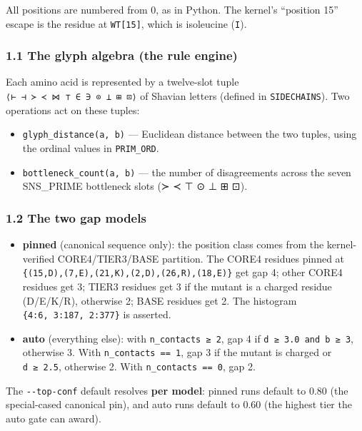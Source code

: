 \documentclass[12pt,a4paper]{article}
\providecommand{\tightlist}{%
  \setlength{\itemsep}{0pt}\setlength{\parskip}{0pt}%
}
\begin{document}
All positions are numbered from 0, as in Python. The kernel's ``position
15'' escape is the residue at \texttt{WT{[}15{]}}, which is isoleucine
(\texttt{\textquotesingle{}I\textquotesingle{}}).

\hypertarget{the-glyph-algebra-the-rule-engine}{%
\subsubsection{1.1 The glyph algebra (the rule
engine)}\label{the-glyph-algebra-the-rule-engine}}

Each amino acid is represented by a twelve-slot tuple
\texttt{⟨⊢\ ⊣\ ≻\ ≺\ ⋈\ ⊤\ ∈\ ∋\ ⊙\ ⊥\ ⊞\ ⊡⟩} of Shavian letters
(defined in \texttt{SIDECHAINS}). Two operations act on these tuples:

\begin{itemize}
\tightlist
\item
  \texttt{glyph\_distance(a,\ b)} --- Euclidean distance between the two
  tuples, using the ordinal values in \texttt{PRIM\_ORD}.
\item
  \texttt{bottleneck\_count(a,\ b)} --- the number of disagreements
  across the seven SNS\_PRIME bottleneck slots (≻ ≺ ⊤ ⊙ ⊥ ⊞ ⊡).
\end{itemize}

\hypertarget{the-two-gap-models}{%
\subsubsection{1.2 The two gap models}\label{the-two-gap-models}}

\begin{itemize}
\tightlist
\item
  \textbf{pinned} (canonical sequence only): the position class comes
  from the kernel-verified CORE4/TIER3/BASE partition. The CORE4
  residues pinned at
  \texttt{\{(15,D),(7,E),(21,K),(2,D),(26,R),(18,E)\}} get gap 4; other
  CORE4 residues get 3; TIER3 residues get 3 if the mutant is a charged
  residue (D/E/K/R), otherwise 2; BASE residues get 2. The histogram
  \texttt{\{4:6,\ 3:187,\ 2:377\}} is asserted.
\item
  \textbf{auto} (everything else): with \texttt{n\_contacts\ ≥\ 2}, gap
  4 if \texttt{d\ ≥\ 3.0\ and\ b\ ≥\ 3}, otherwise 3. With
  \texttt{n\_contacts\ ==\ 1}, gap 3 if the mutant is charged or
  \texttt{d\ ≥\ 2.5}, otherwise 2. With \texttt{n\_contacts\ ==\ 0}, gap
  2.
\end{itemize}

The \texttt{-\/-top-conf} default resolves \textbf{per model}: pinned
runs default to 0.80 (the special-cased canonical pin), and auto runs
default to 0.60 (the highest tier the auto gate can award).
\end{document}
